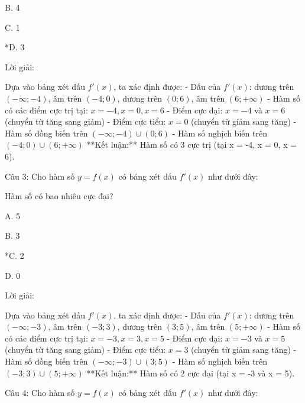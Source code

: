 \documentclass[a4paper,12pt]{article}
\begin{document}
B. 4

C. 1

*D. 3

Lời giải:

Dựa vào bảng xét dấu \(f'(x)\), ta xác định được: - Dấu của \(f'(x)\): dương trên \((-\infty; -4)\), âm trên \((-4; 0)\), dương trên \((0; 6)\), âm trên \((6; +\infty)\) - Hàm số có các điểm cực trị tại: \(x = -4, x = 0, x = 6\) - Điểm cực đại: \(x = -4\) và \(x = 6\) (chuyển từ tăng sang giảm) - Điểm cực tiểu: \(x = 0\) (chuyển từ giảm sang tăng) - Hàm số đồng biến trên \((-\infty; -4) \cup (0; 6)\) - Hàm số nghịch biến trên \((-4; 0) \cup (6; +\infty)\) **Kết luận:** Hàm số có 3 cực trị (tại x = -4, x = 0, x = 6).



Câu 3: Cho hàm số \(y=f(x)\) có bảng xét dấu \(f'(x)\) như dưới đây:


Hàm số có bao nhiêu cực đại?

A. 5

B. 3

*C. 2

D. 0

Lời giải:

Dựa vào bảng xét dấu \(f'(x)\), ta xác định được: - Dấu của \(f'(x)\): dương trên \((-\infty; -3)\), âm trên \((-3; 3)\), dương trên \((3; 5)\), âm trên \((5; +\infty)\) - Hàm số có các điểm cực trị tại: \(x = -3, x = 3, x = 5\) - Điểm cực đại: \(x = -3\) và \(x = 5\) (chuyển từ tăng sang giảm) - Điểm cực tiểu: \(x = 3\) (chuyển từ giảm sang tăng) - Hàm số đồng biến trên \((-\infty; -3) \cup (3; 5)\) - Hàm số nghịch biến trên \((-3; 3) \cup (5; +\infty)\) **Kết luận:** Hàm số có 2 cực đại (tại x = -3 và x = 5).



Câu 4: Cho hàm số \(y=f(x)\) có bảng xét dấu \(f'(x)\) như dưới đây:

\end{document}
